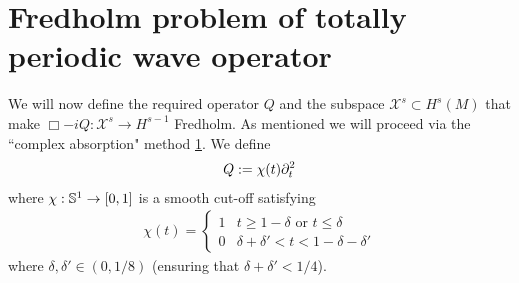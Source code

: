 \documentclass[12pt]{article}
\begin{document}
\section[Main result]{Fredholm problem of totally periodic wave operator} 
We will now define the required operator $Q$ and the subspace $\mathcal{X}^s \subset H^{s}(M)$ that make $\Box - iQ: \mathcal{X}^s \to H^{s -1}$ Fredholm.  As mentioned we will proceed via the ``complex absorption" method \ref{}. We define
\begin{align*}
Q := \chi(t) \p_t^2
\end{align*}
where $\chi : \S^1 \to [0, 1]$ is a smooth cut-off satisfying
\begin{align*}
\chi(t) = 
\begin{cases}
1 & t \geq  1 - \delta \text{ or } t \leq \delta \\
0 &  \delta + \delta' < t < 1 - \delta - \delta'
\end{cases}
\end{align*}
where $\delta, \delta' \in (0, 1/8)$ (ensuring that $\delta+ \delta' < 1/4$). 
\end{document}
